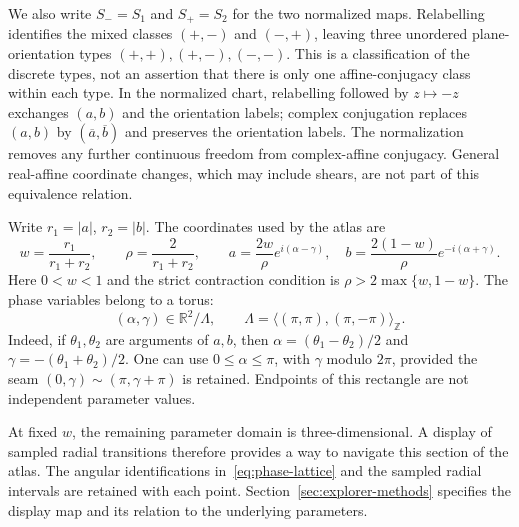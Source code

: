 We also write $S_-=S_1$ and $S_+=S_2$ for the two normalized maps.
Relabelling identifies the mixed classes $(+,-)$ and $(-,+)$,
leaving three unordered plane-orientation types $(+,+),(+,-),(-,-)$.
This is a classification of the discrete types, not an assertion
that there is only one affine-conjugacy class within each type.
In the normalized chart, relabelling followed by $z\mapsto-z$
exchanges $(a,b)$ and the orientation labels; complex conjugation
replaces $(a,b)$ by $(\overline a,\overline b)$ and preserves the
orientation labels. The normalization removes any further continuous
freedom from complex-affine conjugacy. General real-affine
coordinate changes, which may include shears, are not part of
this equivalence relation.

Write $r_1=|a|$, $r_2=|b|$. The coordinates used by the atlas are
\begin{equation}\label{eq:atlas-core-coordinates}
w=\frac{r_1}{r_1+r_2},\qquad \rho=\frac{2}{r_1+r_2},\qquad
a=\frac{2w}{\rho}e^{i(\alpha-\gamma)},\quad
b=\frac{2(1-w)}{\rho}e^{-i(\alpha+\gamma)}.
\end{equation}
Here $0<w<1$ and the strict contraction condition is
$\rho>2\max\{w,1-w\}$. The phase variables belong to a torus:
\begin{equation}\label{eq:phase-lattice}
(\alpha,\gamma)\in\mathbb R^2/\Lambda,\qquad
\Lambda=\langle(\pi,\pi),(\pi,-\pi)\rangle_{\mathbb Z}.
\end{equation}
Indeed, if $\theta_1,\theta_2$ are arguments of $a,b$, then
$\alpha=(\theta_1-\theta_2)/2$ and
$\gamma=-(\theta_1+\theta_2)/2$. One can use
$0\le\alpha\le\pi$, with $\gamma$ modulo $2\pi$, provided the seam
$(0,\gamma)\sim(\pi,\gamma+\pi)$ is retained. Endpoints of this
rectangle are not independent parameter values.

At fixed $w$, the remaining parameter domain is three-dimensional. A display
of sampled radial transitions therefore provides a way to navigate this
section of the atlas. The angular identifications in~\eqref{eq:phase-lattice}
and the sampled radial intervals are retained with each point. Section~\ref{sec:explorer-methods}
specifies the display map and its relation to the underlying parameters.


